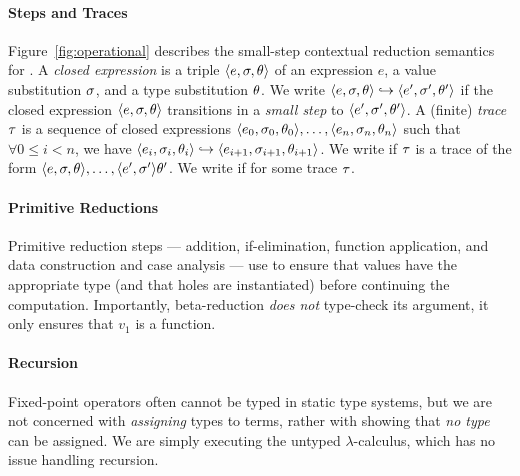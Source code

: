 \paragraph{Steps and Traces}

%
Figure~\ref{fig:operational} describes the small-step contextual
reduction semantics for \lang.
%
A \emph{closed expression} is a triple $\langle e, \sigma, \theta \rangle$ of an expression $e$,
a value substitution $\sigma$, and a type substitution $\theta$.
%
We write $\langle e, \sigma, \theta \rangle \hookrightarrow \langle e', \sigma', \theta' \rangle$ if the closed
expression $\langle e, \sigma, \theta \rangle$ transitions in a \emph{small step} to
$\langle e', \sigma', \theta' \rangle$.
%
A (finite) \emph{trace} $\tau$ is a sequence of closed expressions
$\langle e_0, \sigma_0, \theta_0 \rangle, \ldots, \langle e_n, \sigma_n, \theta_n \rangle$ such that
$\forall 0 \leq i < n$, we have
$\langle e_i, \sigma_i, \theta_i \rangle \hookrightarrow \langle e_{i+1}, \sigma_{i+1}, \theta_{i+1} \rangle$.
%
We write  if $\tau$ is
a trace of the form $\langle e, \sigma, \theta \rangle,\ldots,\langle e', \sigma' \rangle{\ensuremath{\theta}'}$.
%
We write  if
 for some trace $\tau$.

\paragraph{Primitive Reductions}
Primitive reduction steps --- addition, if-elimination, function
application, and data construction and case analysis --- use \forcesym
to ensure that values have the appropriate type (and that holes are
instantiated) before continuing the computation. Importantly,
beta-reduction \emph{does not} type-check its argument, it only ensures
that $v_1$ is a function.

\paragraph{Recursion}
Fixed-point operators often cannot be typed in static type systems, but
we are not concerned with \emph{assigning} types to terms, rather with
showing that \emph{no type} can be assigned. We are simply executing the
untyped $\lambda$-calculus, which has no issue handling recursion.

